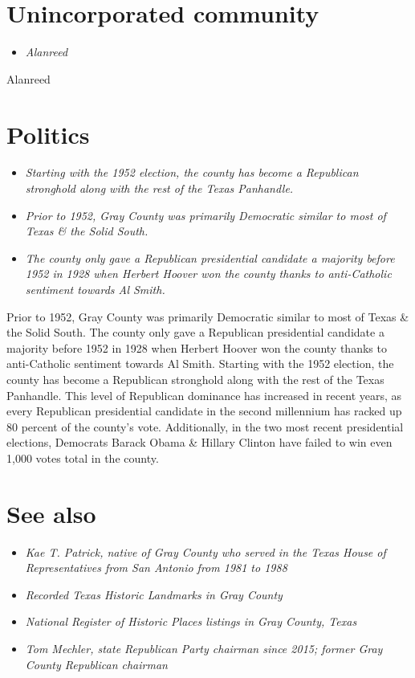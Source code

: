 \section{Unincorporated community}\label{unincorporated-community}

\begin{itemize}
\item
  \emph{Alanreed}
\end{itemize}

Alanreed

\section{Politics}\label{politics}

\begin{itemize}
\item
  \emph{Starting with the 1952 election, the county has become a
  Republican stronghold along with the rest of the Texas Panhandle.}
\item
  \emph{Prior to 1952, Gray County was primarily Democratic similar to
  most of Texas \& the Solid South.}
\item
  \emph{The county only gave a Republican presidential candidate a
  majority before 1952 in 1928 when Herbert Hoover won the county thanks
  to anti-Catholic sentiment towards Al Smith.}
\end{itemize}

Prior to 1952, Gray County was primarily Democratic similar to most of
Texas \& the Solid South. The county only gave a Republican presidential
candidate a majority before 1952 in 1928 when Herbert Hoover won the
county thanks to anti-Catholic sentiment towards Al Smith. Starting with
the 1952 election, the county has become a Republican stronghold along
with the rest of the Texas Panhandle. This level of Republican dominance
has increased in recent years, as every Republican presidential
candidate in the second millennium has racked up 80 percent of the
county's vote. Additionally, in the two most recent presidential
elections, Democrats Barack Obama \& Hillary Clinton have failed to win
even 1,000 votes total in the county.

\section{See also}\label{see-also}

\begin{itemize}
\item
  \emph{Kae T. Patrick, native of Gray County who served in the Texas
  House of Representatives from San Antonio from 1981 to 1988}
\item
  \emph{Recorded Texas Historic Landmarks in Gray County}
\item
  \emph{National Register of Historic Places listings in Gray County,
  Texas}
\item
  \emph{Tom Mechler, state Republican Party chairman since 2015; former
  Gray County Republican chairman}
\end{itemize}

